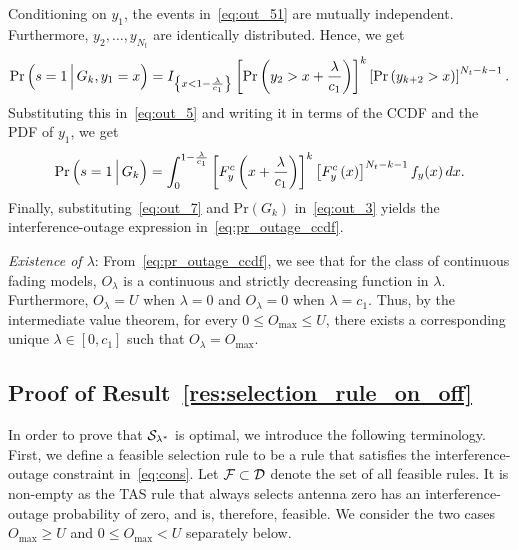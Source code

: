 \documentclass[12pt,draftcls,peerreview,onecolumn]{IEEEtran}
\newcommand{\brac}[1]{\left({#1}\right)}
\newcommand{\cbrac}[1]{\left\{{#1}\right\}}
\newcommand{\indic}[1]{I_{\cbrac{#1}}}
\newcommand{\prob}[1]{\text{Pr}\brac{#1}}
\newcommand{\given}{\arrowvert}
\newcommand{\Given}{\Big\arrowvert}
\newcommand{\setG}{G}
\newcommand{\setGk}{\setG_k}
\newcommand{\lam}{\lambda}
\newcommand{\F}{\cal{F}}
\newcommand{\Nt}{{N_t}}
\newcommand{\outmax}{O_{\text{max}}}
\newcommand{\cone}{c_{1}}
\newcommand{\out}{O}
\newcommand{\lambym}{\frac{\lam}{\cone}}
\newcommand{\yk}[1]{y_{#1}}
\newcommand{\un}{U}
\newcommand{\asspan}{{\cal D}}
\newcommand{\outlam}{\out_{\lam}}
\newcommand{\callamstarrule}{\cal S_{\lam^{*}}}
\begin{document}
Conditioning on $\yk{1}$, the events in~\eqref{eq:out_51} are mutually independent. Furthermore, $\yk{2},\ldots,\yk{\Nt} $ are identically distributed. Hence, we get
%
\begin{equation}
\text{Pr}\brac{s=1\Given \setGk, \yk{1}=x} = \indic{x<1-\lambym}\left[\text{Pr}\brac{\yk{2}>x+\lambym}\right]^{k} \left[\text{Pr}\brac{\yk{k+2}>x}\right]^{\Nt-k-1}.
\label{eq:out_6}
\end{equation}
%
Substituting this in~\eqref{eq:out_5} and writing it in terms of the CCDF and the PDF of $\yk{1}$, we get 
\begin{equation}
\text{Pr}\brac{s=1\Given\setGk} =\int_{0}^{1-\lambym}\left[F_{y}^{c}\left(x+\lambym\right)\right]^k \left[F_{y}^{c}\left(x\right)\right]^{\Nt-k-1}f_{y}(x)\,dx.
\label{eq:out_7}
\end{equation}
Finally, substituting~\eqref{eq:out_7} and $\prob{\setGk}$ in~\eqref{eq:out_3} yields the interference-outage expression in~\eqref{eq:pr_outage_ccdf}. 

{\em Existence of $\lam$}: From~\eqref{eq:pr_outage_ccdf}, we see that for the class of continuous fading models, $\outlam$ is a continuous and strictly decreasing  function in $\lam$. %
Furthermore, $\outlam=\un$ when $\lam=0$ and $\outlam=0$ when $\lam=\cone$. Thus, by the intermediate value theorem, for every $0\leq\outmax\leq\un$,  there exists a corresponding unique $\lam\in[0,\cone]$ such that $\outlam=\outmax$. 
  

		

\subsection{Proof of Result~\ref{res:selection_rule_on_off}}
\label{proof:selection_rule_on_off}
In order to prove that $\callamstarrule$ is optimal, we introduce the following terminology. First, we define a feasible selection rule to be a rule that satisfies the interference-outage constraint in~\eqref{eq:cons}. Let $\F\subset\asspan$ denote the set of all feasible rules. It is non-empty as the TAS rule that always selects antenna zero has an interference-outage probability of zero, and is, therefore, feasible.  We consider the two cases $\outmax\geq\un$ and $0\leq\outmax<\un$ separately below.
\end{document}
